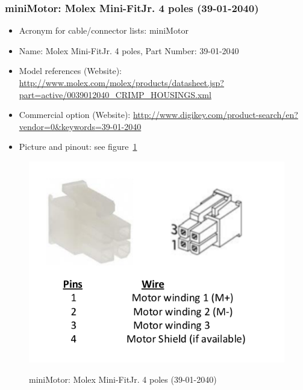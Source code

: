 \subsubsection{miniMotor: Molex Mini-Fit\textregistered Jr. 4 poles (39-01-2040)} \label{DEVICE:miniMotor}
\begin{itemize}
  \item Acronym for cable/connector lists: miniMotor
  \item Name: Molex Mini-Fit\textregistered Jr. 4 poles, Part Number: 39-01-2040
  \item Model references (Website): \href{http://www.molex.com/molex/products/datasheet.jsp?part=active/0039012040\_CRIMP\_HOUSINGS.xml}{http://www.molex.com/molex/products/datasheet.jsp?part=active/0039012040\_CRIMP\_HOUSINGS.xml}
  \item Commercial option (Website): \href{http://www.digikey.com/product-search/en?vendor=0\&keywords=39-01-2040}{http://www.digikey.com/product-search/en?vendor=0\&keywords=39-01-2040}
  \item Picture and pinout: see figure~\ref{FIG:DEVICEminiMotor}
\end{itemize}
\begin{figure}
  \centering
  \includegraphics[angle=90,width=1\columnwidth]{figs/body02/FIGDEVICEminiMotor.pdf}\\
  \caption[miniMotor: Molex Mini-Fit\textregistered Jr. 4 poles (39-01-2040)]{miniMotor: Molex Mini-Fit\textregistered Jr. 4 poles (39-01-2040)}
  \label{FIG:DEVICEminiMotor}
\end{figure}
